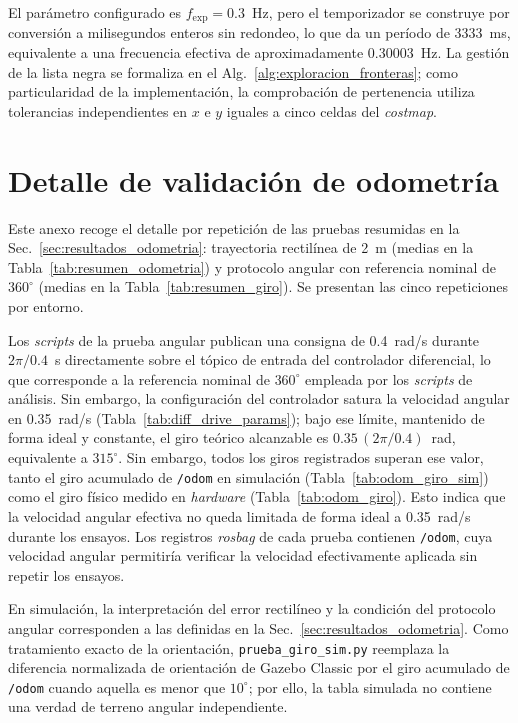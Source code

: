 \begin{appendices}
El parámetro configurado es $f_{\mathrm{exp}}=0.3$~Hz, pero el temporizador se construye por conversión a milisegundos enteros sin redondeo, lo que da un período de 3333~ms, equivalente a una frecuencia efectiva de aproximadamente 0.30003~Hz. La gestión de la lista negra se formaliza en el Alg.~\ref{alg:exploracion_fronteras}; como particularidad de la implementación, la comprobación de pertenencia utiliza tolerancias independientes en $x$ e $y$ iguales a cinco celdas del \textit{costmap}.

\section{Detalle de validación de odometría}
\label{anx:odometria_detalle}

Este anexo recoge el detalle por repetición de las pruebas resumidas en la Sec.~\ref{sec:resultados_odometria}: trayectoria rectilínea de 2~m (medias en la Tabla~\ref{tab:resumen_odometria}) y protocolo angular con referencia nominal de $360^\circ$ (medias en la Tabla~\ref{tab:resumen_giro}). Se presentan las cinco repeticiones por entorno.

Los \textit{scripts} de la prueba angular publican una consigna de 0.4~rad/s durante
$2\pi/0.4$~s directamente sobre el tópico de entrada del controlador
diferencial, lo que corresponde a la referencia nominal de $360^\circ$
empleada por los \textit{scripts} de análisis. Sin embargo, la configuración del
controlador satura la velocidad angular en 0.35~rad/s
(Tabla~\ref{tab:diff_drive_params}); bajo ese límite, mantenido de forma
ideal y constante, el giro teórico alcanzable es
$0.35\,(2\pi/0.4)$~rad, equivalente a $315^\circ$. Sin embargo, todos los giros registrados superan ese valor, tanto el giro acumulado de \texttt{/odom} en simulación (Tabla~\ref{tab:odom_giro_sim}) como el giro físico medido en \textit{hardware} (Tabla~\ref{tab:odom_giro}). Esto indica que la velocidad angular efectiva no queda limitada de forma ideal a 0.35~rad/s durante los ensayos. Los registros \textit{rosbag} de cada prueba contienen \texttt{/odom}, cuya velocidad angular permitiría verificar la velocidad efectivamente aplicada sin repetir los ensayos.

En simulación, la interpretación del error rectilíneo y la condición del protocolo angular corresponden a las definidas en la Sec.~\ref{sec:resultados_odometria}. Como tratamiento exacto de la orientación, \texttt{prueba\_giro\_sim.py} reemplaza la diferencia normalizada de orientación de Gazebo Classic por el giro acumulado de \texttt{/odom} cuando aquella es menor que $10^\circ$; por ello, la tabla simulada no contiene una verdad de terreno angular independiente.


\end{appendices}
